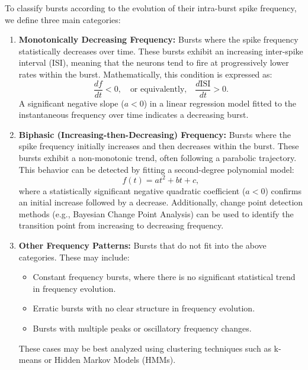 \documentclass[a4paper,9pt]{extarticle}
\begin{document}
To classify bursts according to the evolution of their intra-burst spike frequency, we define three main categories:

\begin{enumerate}
    \item \textbf{Monotonically Decreasing Frequency:} Bursts where the spike frequency statistically decreases over time. These bursts exhibit an increasing inter-spike interval (ISI), meaning that the neurons tend to fire at progressively lower rates within the burst. Mathematically, this condition is expressed as:
    \begin{equation}
        \frac{d f}{dt} < 0, \quad \text{or equivalently,} \quad \frac{d \text{ISI}}{dt} > 0.
    \end{equation}
    A significant negative slope (\( a < 0 \)) in a linear regression model fitted to the instantaneous frequency over time indicates a decreasing burst.

    \item \textbf{Biphasic (Increasing-then-Decreasing) Frequency:} Bursts where the spike frequency initially increases and then decreases within the burst. These bursts exhibit a non-monotonic trend, often following a parabolic trajectory. This behavior can be detected by fitting a second-degree polynomial model:
    \begin{equation}
        f(t) = a t^2 + b t + c,
    \end{equation}
    where a statistically significant negative quadratic coefficient (\( a < 0 \)) confirms an initial increase followed by a decrease. Additionally, change point detection methods (e.g., Bayesian Change Point Analysis) can be used to identify the transition point from increasing to decreasing frequency.

    \item \textbf{Other Frequency Patterns:} Bursts that do not fit into the above categories. These may include:
    \begin{itemize}
        \item Constant frequency bursts, where there is no significant statistical trend in frequency evolution.
        \item Erratic bursts with no clear structure in frequency evolution.
        \item Bursts with multiple peaks or oscillatory frequency changes.
    \end{itemize}
    These cases may be best analyzed using clustering techniques such as k-means or Hidden Markov Models (HMMs).
\end{enumerate}
\end{document}
